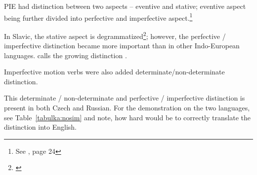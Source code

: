 PIE had distinction between two aspects -- eventive and stative; eventive aspect being further divided into perfective and imperfective aspect.\footnote{See \cite{ringe2008proto}, page 24}

In Slavic, the sta\-tive as\-pect is de\-gra\-mma\-tized\footnote{\cite{andersen2013origin}}; ho\-we\-ver, the per\-fec\-tive / im\-per\-fe\-ctive di\-stin\-ction be\-came more important than in other Indo-European languages. \cite{sussex2011slavic} calls the growing distinction .

Imperfective motion verbs were also added determinate/non-determinate distinction.

This determinate / non-determinate and perfective / imperfective distinction is present in both Czech and Russian. For the demonstration on the two languages, see Table~\ref{tabulka:nosim} and note, how hard would be to correctly translate the distinction into English.

